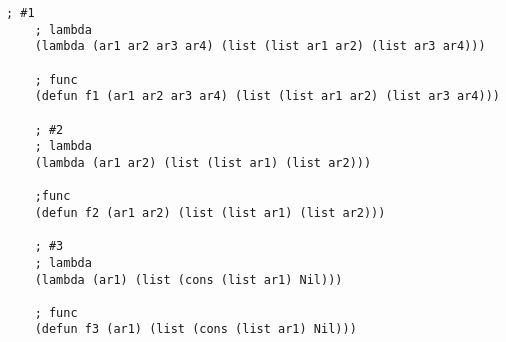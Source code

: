 \begin{center}
    \captionsetup{justification=raggedright,singlelinecheck=off}
    \begin{lstlisting}[label=lst:d_l_rec,caption=Решение задания №5]
    ; #1
    ; lambda
    (lambda (ar1 ar2 ar3 ar4) (list (list ar1 ar2) (list ar3 ar4)))
    
    ; func
    (defun f1 (ar1 ar2 ar3 ar4) (list (list ar1 ar2) (list ar3 ar4)))
    
    ; #2
    ; lambda
    (lambda (ar1 ar2) (list (list ar1) (list ar2)))
    
    ;func
    (defun f2 (ar1 ar2) (list (list ar1) (list ar2)))
    
    ; #3
    ; lambda
    (lambda (ar1) (list (cons (list ar1) Nil)))
    
    ; func
    (defun f3 (ar1) (list (cons (list ar1) Nil)))
\end{lstlisting}
\end{center}

